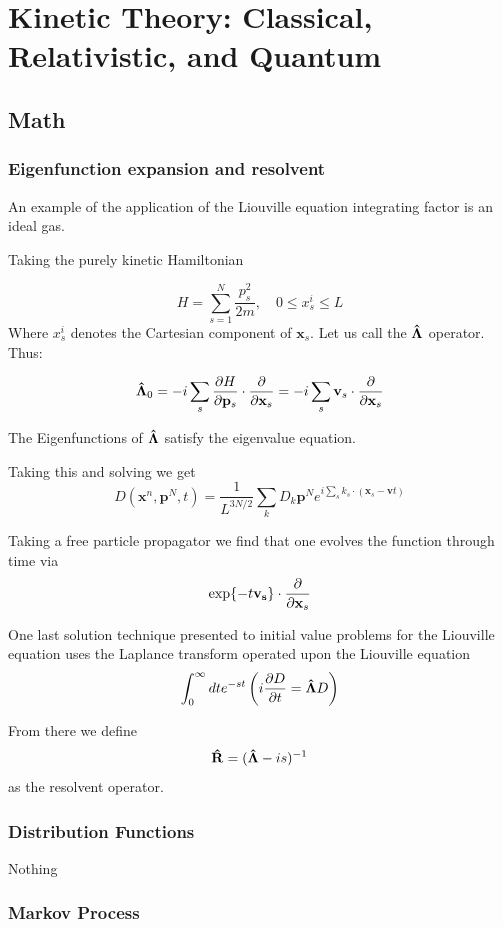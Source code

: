 \chapter{Kinetic Theory: Classical, Relativistic, and Quantum}
\section{Math}
\subsection{Eigenfunction expansion and resolvent}
An example of the application of the Liouville equation integrating factor is an ideal gas.

Taking the purely kinetic Hamiltonian

\[
H = \sum_{s=1}^N \frac{p^2_s}{2m}, \quad 0 \leq x^{i}_s \leq L
  \]
  Where $ x^{i}_s$ denotes the  Cartesian component of $\mathbf{x}_s$. Let us call the $\vu{\Lambda}$ operator. Thus:

\[
\vu{\Lambda}_0 = -i \sum_s \pdv{H}{\mathbf{p}_s} \cdot \pdv{}{\mathbf{x}_s} = -i \sum_s \mathbf{v}_s \cdot \pdv{}{\mathbf{x}_s}
  \]

  The Eigenfunctions of $\vu{\Lambda}$ satisfy the eigenvalue equation.

Taking this and solving we get
\[
D(\mathbf{x}^n, \mathbf{p}^N, t) = \frac{1}{L^{3N/2}}\sum_k D_k \mathbf{p}^Ne^{i \sum_s k_s \cdot (\mathbf{x}_s-\mathbf{v}t)}
  \]

  Taking a free particle propagator we find that one evolves the function through time via
\[
  \exp{-t \mathbf{v_s}} \cdot \pdv{}{\mathbf{x}_s} \]

One last solution technique presented to initial value problems for the Liouville equation uses the Laplance transform operated upon the Liouville equation
\[
\int_0^\infty dte^{-st}\left(i \pdv{D}{t} = \vu{\Lambda}D  \right)
  \]

  From there we define
\[
\vu{R} = (\vu{\Lambda} - is)^{-1}
  \]
  as the resolvent operator.

\subsection{Distribution Functions}

Nothing

\subsection{Markov Process}

